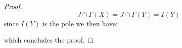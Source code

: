 \documentclass{article}
\begin{document}
\begin{proof}
            \begin{equation*}
                J \cap \Gamma(X) = J \cap\Gamma(Y) = I(Y)
            \end{equation*}
        since $I(Y)$ is the pole we then have:
            \begin{center}
            \end{center}
        which concludes the proof.
    \end{proof}
\end{document}
